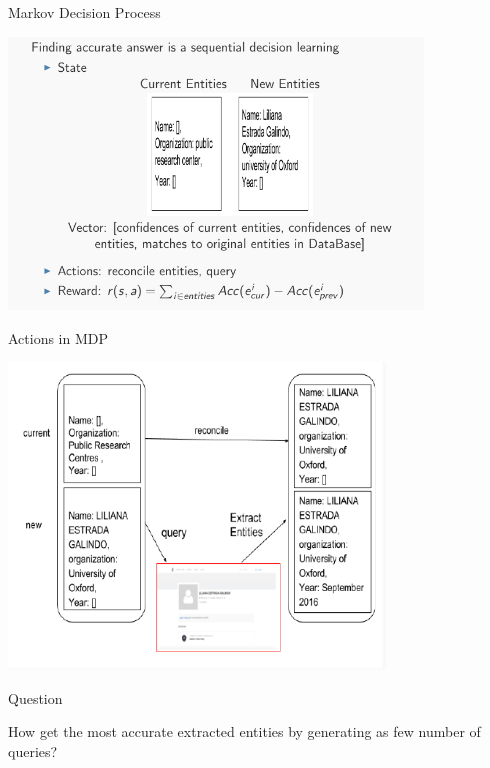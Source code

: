 \documentclass{beamer}
\begin{document}
\begin{frame}{Markov Decision Process}
\begin{center}
	\includegraphics[width=11cm]{iimas/mdp.pdf}
\end{center}
\end{frame}

\begin{frame}{Actions in MDP}
\begin{center}
	\includegraphics[width=10cm]{iimas/actions.pdf}
\end{center}
\end{frame}


\begin{frame}{Question}

\begin{center}
How get the most accurate extracted entities by generating as few
number of queries?
\end{center}

\end{frame}
\end{document}
